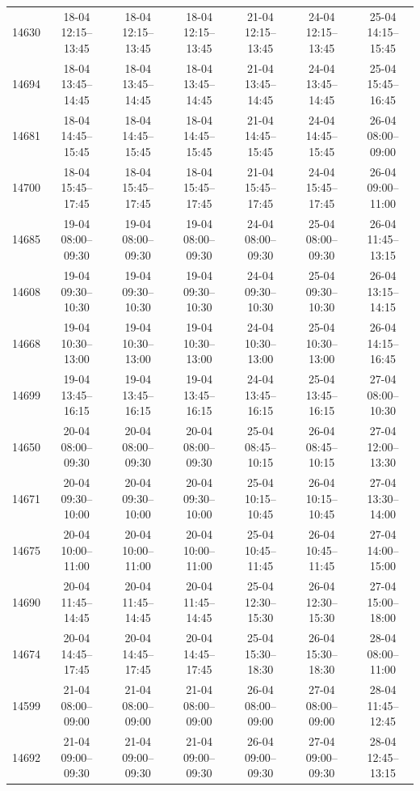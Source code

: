 \begin{table}[htbp]
\begin{tabular}{|r|c|c|c|c|c|c|}
14630 & 18-04 12:15--13:45 & 18-04 12:15--13:45 & 18-04 12:15--13:45 & 21-04 12:15--13:45 & 24-04 12:15--13:45 & 25-04 14:15--15:45 \\ 
14694 & 18-04 13:45--14:45 & 18-04 13:45--14:45 & 18-04 13:45--14:45 & 21-04 13:45--14:45 & 24-04 13:45--14:45 & 25-04 15:45--16:45 \\ 
14681 & 18-04 14:45--15:45 & 18-04 14:45--15:45 & 18-04 14:45--15:45 & 21-04 14:45--15:45 & 24-04 14:45--15:45 & 26-04 08:00--09:00 \\ 
14700 & 18-04 15:45--17:45 & 18-04 15:45--17:45 & 18-04 15:45--17:45 & 21-04 15:45--17:45 & 24-04 15:45--17:45 & 26-04 09:00--11:00 \\ 
14685 & 19-04 08:00--09:30 & 19-04 08:00--09:30 & 19-04 08:00--09:30 & 24-04 08:00--09:30 & 25-04 08:00--09:30 & 26-04 11:45--13:15 \\ 
14608 & 19-04 09:30--10:30 & 19-04 09:30--10:30 & 19-04 09:30--10:30 & 24-04 09:30--10:30 & 25-04 09:30--10:30 & 26-04 13:15--14:15 \\ 
14668 & 19-04 10:30--13:00 & 19-04 10:30--13:00 & 19-04 10:30--13:00 & 24-04 10:30--13:00 & 25-04 10:30--13:00 & 26-04 14:15--16:45 \\ 
14699 & 19-04 13:45--16:15 & 19-04 13:45--16:15 & 19-04 13:45--16:15 & 24-04 13:45--16:15 & 25-04 13:45--16:15 & 27-04 08:00--10:30 \\ 
14650 & 20-04 08:00--09:30 & 20-04 08:00--09:30 & 20-04 08:00--09:30 & 25-04 08:45--10:15 & 26-04 08:45--10:15 & 27-04 12:00--13:30 \\ 
14671 & 20-04 09:30--10:00 & 20-04 09:30--10:00 & 20-04 09:30--10:00 & 25-04 10:15--10:45 & 26-04 10:15--10:45 & 27-04 13:30--14:00 \\ 
14675 & 20-04 10:00--11:00 & 20-04 10:00--11:00 & 20-04 10:00--11:00 & 25-04 10:45--11:45 & 26-04 10:45--11:45 & 27-04 14:00--15:00 \\ 
14690 & 20-04 11:45--14:45 & 20-04 11:45--14:45 & 20-04 11:45--14:45 & 25-04 12:30--15:30 & 26-04 12:30--15:30 & 27-04 15:00--18:00 \\ 
14674 & 20-04 14:45--17:45 & 20-04 14:45--17:45 & 20-04 14:45--17:45 & 25-04 15:30--18:30 & 26-04 15:30--18:30 & 28-04 08:00--11:00 \\ 
14599 & 21-04 08:00--09:00 & 21-04 08:00--09:00 & 21-04 08:00--09:00 & 26-04 08:00--09:00 & 27-04 08:00--09:00 & 28-04 11:45--12:45 \\ 
14692 & 21-04 09:00--09:30 & 21-04 09:00--09:30 & 21-04 09:00--09:30 & 26-04 09:00--09:30 & 27-04 09:00--09:30 & 28-04 12:45--13:15 \\ 

\end{tabular}
\end{table}
